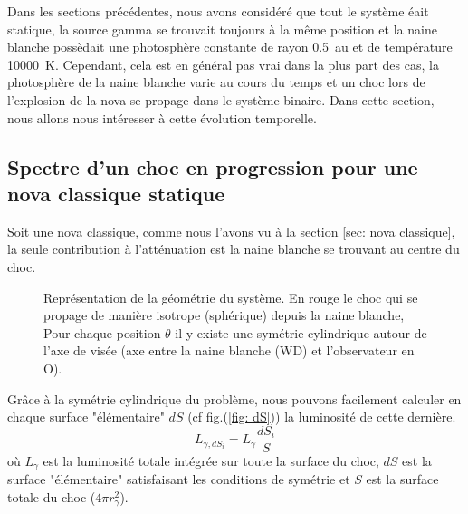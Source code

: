 \documentclass[a4paper,12pt,twoside]{article}
\begin{document}
Dans les sections précédentes, nous avons considéré que tout le système éait statique, la source gamma se trouvait toujours à la même position et la naine blanche possèdait une photosphère constante de rayon \SI{0.5}{\astronomicalunit} et de température \SI{10000}{\K}. Cependant, cela est en général pas vrai dans la plus part des cas, la photosphère de la naine blanche varie au cours du temps et un choc lors de l'explosion de la nova se propage dans le système binaire. Dans cette section, nous allons nous intéresser à cette évolution temporelle.

\subsection{Spectre d'un choc en progression pour une nova classique statique}

Soit une nova classique, comme nous l'avons vu à la section \ref{sec: nova classique}, la seule contribution à l'atténuation est la naine blanche se trouvant au centre du choc.
\begin{figure}[H]
	\centering
    \caption{Représentation de la géométrie du système. En rouge le choc qui se propage de manière isotrope (sphérique) depuis la naine blanche, Pour chaque position $\theta$ il y existe une symétrie cylindrique autour de l'axe de visée (axe entre la naine blanche (WD) et l'observateur en O).}
    \label{fig: choc}
\end{figure}

Grâce à la symétrie cylindrique du problème, nous pouvons facilement calculer en chaque surface "élémentaire" $d S$ (cf fig.(\ref{fig: dS})) la luminosité de cette dernière.
\begin{equation}
	L_{\gamma,dS_i} = L_\gamma \frac{dS_i}{S}
    \label{eq: elementary luminosity}
\end{equation}
où $L_\gamma$ est la luminosité totale intégrée sur toute la surface du choc, $dS$ est la surface "élémentaire" satisfaisant les conditions de symétrie et $S$ est la surface totale du choc ($4\pi r_\gamma^2$).
\end{document}
